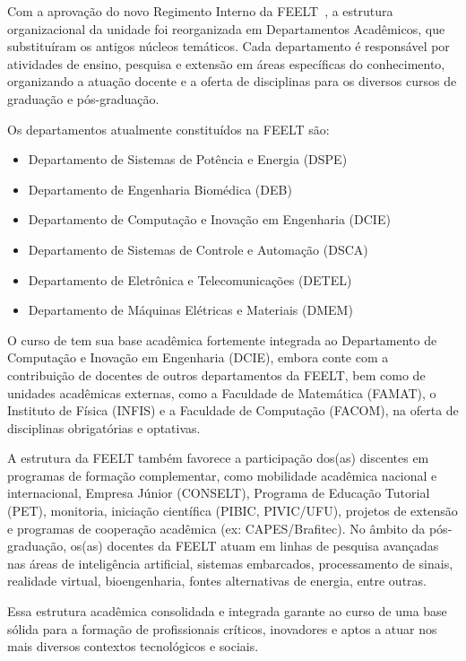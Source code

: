 Com a aprovação do novo Regimento Interno da FEELT~\cite{UFU:FEELT:Regimento:2023}, a estrutura organizacional da unidade foi reorganizada em Departamentos Acadêmicos, que substituíram os antigos núcleos temáticos. Cada departamento é responsável por atividades de ensino, pesquisa e extensão em áreas específicas do conhecimento, organizando a atuação docente e a oferta de disciplinas para os diversos cursos de graduação e pós-graduação.

Os departamentos atualmente constituídos na FEELT são:

\begin{itemize}
    \item Departamento de Sistemas de Potência e Energia (DSPE)
    \item Departamento de Engenharia Biomédica (DEB)
    \item Departamento de Computação e Inovação em Engenharia (DCIE)
    \item Departamento de Sistemas de Controle e Automação (DSCA)
    \item Departamento de Eletrônica e Telecomunicações (DETEL)
    \item Departamento de Máquinas Elétricas e Materiais (DMEM)
\end{itemize}

O curso de \nomecursonovo tem sua base acadêmica fortemente integrada ao Departamento de Computação e Inovação em Engenharia (DCIE), embora conte com a contribuição de docentes de outros departamentos da FEELT, bem como de unidades acadêmicas externas, como a Faculdade de Matemática (FAMAT), o Instituto de Física (INFIS) e a Faculdade de Computação (FACOM), na oferta de disciplinas obrigatórias e optativas.

A estrutura da FEELT também favorece a participação dos(as) discentes em programas de formação complementar, como mobilidade acadêmica nacional e internacional, Empresa Júnior (CONSELT), Programa de Educação Tutorial (PET), monitoria, iniciação científica (PIBIC, PIVIC/UFU), projetos de extensão e programas de cooperação acadêmica (ex: CAPES/Brafitec). No âmbito da pós-graduação, os(as) docentes da FEELT atuam em linhas de pesquisa avançadas nas áreas de inteligência artificial, sistemas embarcados, processamento de sinais, realidade virtual, bioengenharia, fontes alternativas de energia, entre outras.

Essa estrutura acadêmica consolidada e integrada garante ao curso de \nomecursonovo uma base sólida para a formação de profissionais críticos, inovadores e aptos a atuar nos mais diversos contextos tecnológicos e sociais.

